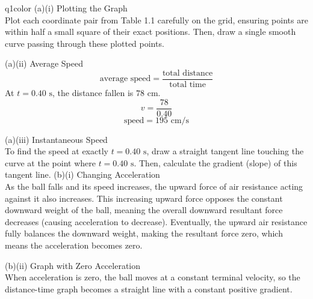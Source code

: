 \documentclass[11pt,a4paper]{article}
\begin{document}
\begin{ansbox}{q1color}
(a)(i) Plotting the Graph\\[4pt]
Plot each coordinate pair from Table 1.1 carefully on the grid, ensuring points are within half a small square of their exact positions. Then, draw a single smooth curve passing through these plotted points.

\vspace{4pt}
(a)(ii) Average Speed\\[4pt]
\[ \text{average speed} = \frac{\text{total distance}}{\text{total time}} \]
At $t = 0.40 \text{ s}$, the distance fallen is $78 \text{ cm}$.
\[ v = \frac{78}{0.40} \]
\[ \text{speed} = \boxed{195 \text{ cm/s}} \]

\vspace{4pt}
(a)(iii) Instantaneous Speed\\[4pt]
To find the speed at exactly $t = 0.40 \text{ s}$, draw a straight tangent line touching the curve at the point where $t = 0.40 \text{ s}$. Then, calculate the gradient (slope) of this tangent line.
\clearpage
\vspace{4pt}
(b)(i) Changing Acceleration\\[4pt]
As the ball falls and its speed increases, the upward force of air resistance acting against it also increases. This increasing upward force opposes the constant downward weight of the ball, meaning the overall downward resultant force decreases (causing acceleration to decrease). Eventually, the upward air resistance fully balances the downward weight, making the resultant force zero, which means the acceleration becomes zero.

\vspace{4pt}
(b)(ii) Graph with Zero Acceleration\\[4pt]
When acceleration is zero, the ball moves at a constant terminal velocity, so the distance-time graph becomes a straight line with a constant positive gradient.
\end{ansbox}
\end{document}

